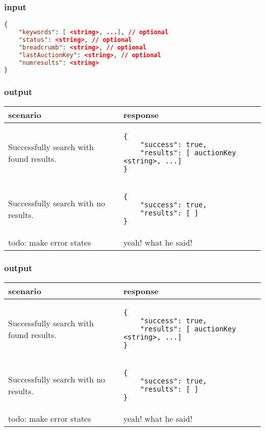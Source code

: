 \documentclass[12pt,a4paper]{article}
\begin{document}
\subsubsection{input}
\begin{lstlisting}[language=json,firstnumber=1]
{
    "keywords": [ <string>, ...], // optional
    "status": <string>, // optional
    "breadcrumb": <string>, // optional
    "lastAuctionKey": <string>, // optional
    "numresults": <string>
}
\end{lstlisting}

\subsubsection{output}
\begin{center}
    \begin{tabular}{| p{5cm} | l |}
        \hline
        \textbf{scenario} & \textbf{response} \\
        \hline
        Successfully search with found results. &
        \begin{lstlisting}[boxpos=t,language=tablejson,firstnumber=1]
{
    "success": true,
    "results": [ auctionKey <string>, ...]
}
        \end{lstlisting} \\ 
        \hline
 \hline
        Successfully search with no results. &
        \begin{lstlisting}[boxpos=t,language=tablejson,firstnumber=1]
{
    "success": true,
    "results": [ ]
}
        \end{lstlisting} \\ 
        \hline
            todo: make error states & yeah! what he said! \\
        \hline
    \end{tabular}
\end{center}


\subsubsection{output}
\begin{center}
    \begin{tabular}{| p{5cm} | l |}
        \hline
        \textbf{scenario} & \textbf{response} \\
        \hline
        Successfully search with found results. &
        \begin{lstlisting}[boxpos=t,language=tablejson,firstnumber=1]
{
    "success": true,
    "results": [ auctionKey <string>, ...]
}
        \end{lstlisting} \\ 
        \hline
 \hline
        Successfully search with no results. &
        \begin{lstlisting}[boxpos=t,language=tablejson,firstnumber=1]
{
    "success": true,
    "results": [ ]
}
        \end{lstlisting} \\ 
        \hline
            todo: make error states & yeah! what he said! \\
        \hline
    \end{tabular}
\end{center}
\end{document}
